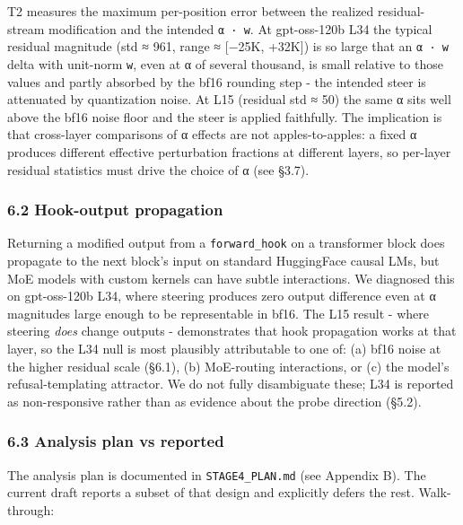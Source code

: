 \documentclass[
]{article}
\begin{document}
T2 measures the maximum per-position error between the realized
residual-stream modification and the intended \texttt{α\ ·\ w}. At
gpt-oss-120b L34 the typical residual magnitude (std ≈ 961, range ≈
{[}−25K, +32K{]}) is so large that an \texttt{α\ ·\ w} delta with
unit-norm \texttt{w}, even at α of several thousand, is small relative
to those values and partly absorbed by the bf16 rounding step - the
intended steer is attenuated by quantization noise. At L15 (residual std
≈ 50) the same α sits well above the bf16 noise floor and the steer is
applied faithfully. The implication is that cross-layer comparisons of α
effects are not apples-to-apples: a fixed α produces different effective
perturbation fractions at different layers, so per-layer residual
statistics must drive the choice of α (see §3.7).

\subsubsection{6.2 Hook-output
propagation}\label{hook-output-propagation}

Returning a modified output from a \texttt{forward\_hook} on a
transformer block does propagate to the next block's input on standard
HuggingFace causal LMs, but MoE models with custom kernels can have
subtle interactions. We diagnosed this on gpt-oss-120b L34, where
steering produces zero output difference even at α magnitudes large
enough to be representable in bf16. The L15 result - where steering
\emph{does} change outputs - demonstrates that hook propagation works at
that layer, so the L34 null is most plausibly attributable to one of:
(a) bf16 noise at the higher residual scale (§6.1), (b) MoE-routing
interactions, or (c) the model's refusal-templating attractor. We do not
fully disambiguate these; L34 is reported as non-responsive rather than
as evidence about the probe direction (§5.2).

\subsubsection{6.3 Analysis plan vs
reported}\label{analysis-plan-vs-reported}

The analysis plan is documented in \texttt{STAGE4\_PLAN.md} (see
Appendix B). The current draft reports a subset of that design and
explicitly defers the rest. Walk-through:
\end{document}
